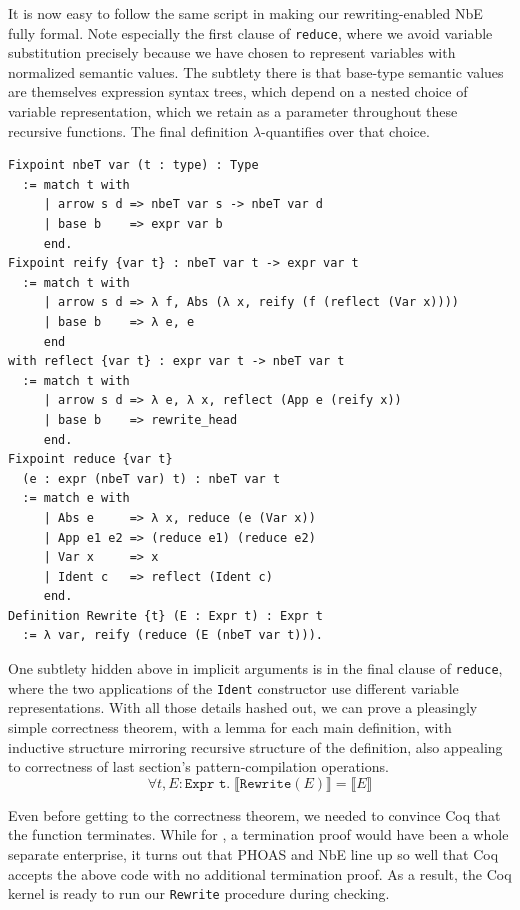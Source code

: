 It is now easy to follow the same script in making our rewriting-enabled NbE fully formal.
Note especially the first clause of \texttt{reduce}, where we avoid variable substitution precisely because we have chosen to represent variables with normalized semantic values.
The subtlety there is that base-type semantic values are themselves expression syntax trees, which depend on a nested choice of variable representation, which we retain as a parameter throughout these recursive functions.
The final definition $\lambda$-quantifies over that choice.
\begin{verbatim}
Fixpoint nbeT var (t : type) : Type
  := match t with
     | arrow s d => nbeT var s -> nbeT var d
     | base b    => expr var b
     end.
Fixpoint reify {var t} : nbeT var t -> expr var t
  := match t with
     | arrow s d => λ f, Abs (λ x, reify (f (reflect (Var x))))
     | base b    => λ e, e
     end
with reflect {var t} : expr var t -> nbeT var t
  := match t with
     | arrow s d => λ e, λ x, reflect (App e (reify x))
     | base b    => rewrite_head
     end.
Fixpoint reduce {var t}
  (e : expr (nbeT var) t) : nbeT var t
  := match e with
     | Abs e     => λ x, reduce (e (Var x))
     | App e1 e2 => (reduce e1) (reduce e2)
     | Var x     => x
     | Ident c   => reflect (Ident c)
     end.
Definition Rewrite {t} (E : Expr t) : Expr t
  := λ var, reify (reduce (E (nbeT var t))).
\end{verbatim}

One subtlety hidden above in implicit arguments is in the final clause of \texttt{reduce}, where the two applications of the \texttt{Ident} constructor use different variable representations.
With all those details hashed out, we can prove a pleasingly simple correctness theorem, with a lemma for each main definition, with inductive structure mirroring recursive structure of the definition, also appealing to correctness of last section's pattern-compilation operations.
$$\forall t, E : \texttt{Expr t}. \; \llbracket \texttt{Rewrite}(E) \rrbracket = \llbracket E \rrbracket$$

Even before getting to the correctness theorem, we needed to convince Coq that the function terminates.
While for \textcite{Aehlig}, a termination proof would have been a whole separate enterprise, it turns out that PHOAS and NbE line up so well that Coq accepts the above code with no additional termination proof.
As a result, the Coq kernel is ready to run our \texttt{Rewrite} procedure during checking.

